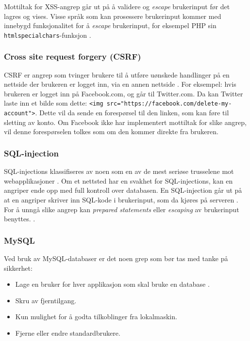 Mottiltak for XSS-angrep går ut på å validere og \textit{escape} brukerinput før det lagres og vises.
Visse språk som kan prosessere brukerinput kommer med innebygd funksjonalitet for å \textit{escape} brukerinput, for eksempel PHP sin \lstinline{htmlspecialchars}-funksjon \cite{php_htmlspecialchars}.

\subsubsection{Cross site request forgery (CSRF)}
\label{sec:analysis-security-csrf}
CSRF er angrep som tvinger brukere til å utføre uønskede handlinger på en nettside der brukeren er logget inn, via en annen nettside \cite[s.~183-186]{NattTomHeine2015Datasikkerhet}. For eksempel: hvis brukeren er logget inn på Facebook.com, og går til Twitter.com. Da kan Twitter laste inn et bilde som dette: \lstinline{<img src="https://facebook.com/delete-my-account">}. Dette vil da sende en forespørsel til den linken, som kan føre til sletting av konto. Om Facebook ikke har implementert mottiltak for slike angrep, vil denne forespørselen tolkes som om den kommer direkte fra brukeren.

\subsubsection{SQL-injection}
\label{sec:analysis-security-sql-injection}
SQL-injections klassifiseres av noen som en av de mest seriøse trusselene mot webapplikasjoner \cite[s.~1]{halfond2006classification}. Om et nettsted har en svakhet for SQL-injections, kan en angriper ende opp med full kontroll over databasen.
En SQL-injection går ut på at en angriper skriver inn SQL-kode i brukerinput, som da kjøres på serveren \cite[s.~2]{halfond2006classification}.
For å unngå slike angrep kan \textit{prepared statements} eller \textit{escaping} av brukerinput benyttes. \cite[s.~6]{halfond2006classification}.

\subsubsection{MySQL}
\label{sec:analysis-security-mysql}
Ved bruk av MySQL-databaser er det noen grep som bør tas med tanke 
på sikkerhet:
\begin{itemize}
\item Lage en bruker for hver applikasjon som skal bruke en database \cite{ellingwood_2013}.
\item Skru av fjerntilgang.
\item Kun mulighet for å godta tilkoblinger fra lokalmaskin.
\item Fjerne eller endre standardbrukere.
\end{itemize}

